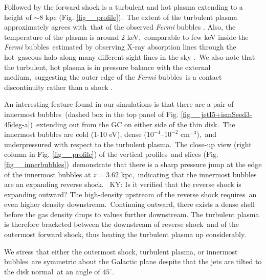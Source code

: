 \documentclass[fleqn,usenatbib,useAMS]{mnras}
\begin{document}
 Followed by the forward shock is a turbulent and hot plasma extending to a height of $\sim 8$ kpc (Fig. \ref{fig__profile}).\
 The extent of the turbulent plasma approximately agrees with\
 that of the observed \textit{Fermi} bubbles \citep{Su2010}.
 Also, the temperature of the plasma is around 2 keV,\
 comparable to few keV inside the \textit{Fermi} bubbles\
 estimated by observing X-ray absorption lines through the hot\
 gaseous halo along many different sight lines in the sky \citep{Miller_2013}.\
 We also note that the turbulent, hot plasma is in pressure balance with the external medium,\
 suggesting the outer edge of the \textit{Fermi} bubbles\
 is a contact discontinuity rather than a shock \citep{Zhang2020}.


 An interesting feature found in our simulations is that there are a pair of innermost bubbles\
 (dashed box in the top panel of Fig. \ref{fig__jetI5+ismSeed3-45deg-a})\
 extending out from the GC on either side of the thin disk.\
 The innermost bubbles are cold (1-10 eV), dense ($10^{-4}$--$10^{-2}$ cm$^{-3}$),\
 and underpressured with respect to the turbulent plasma.\
 The close-up view (right column in Fig. \ref{fig__profile}) of the vertical profiles\
 and slices (Fig. \ref{fig__innerbubbles})\
 demonstrate that there is a sharp pressure jump at the edge of the innermost bubbles at $z=3.62$ kpc,\
 indicating that the innermost bubbles are an expanding reverse shock.\ {\color{red} KY: Is it verified that the reverse shock is expanding outward?}
 The high-density upstream of the reverse shock requires\
 an even higher density downstream.\
 Continuing outward, there exists a dense shell before the gas density drops to values further downstream.
 The turbulent plasma is therefore bracketed between the downstream of reverse shock\
 and of the outermost forward shock, thus heating the turbulent plasma up considerably.

 We stress that either the outermost shock, turbulent plasma, or innermost bubbles\
 are symmetric about the Galactic plane despite that the jets are tilted to the disk normal\
 at an angle of $45^{\circ}$.
\end{document}
